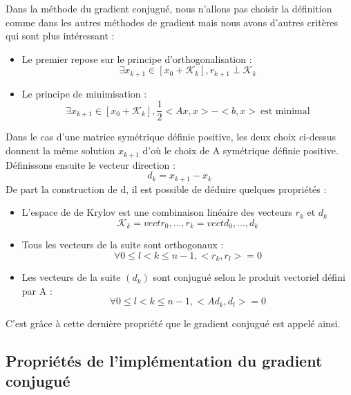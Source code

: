 Dans la méthode du gradient conjugué, nous n'allons pas choisir la définition comme dans les autres méthodes de gradient mais nous avons d'autres critères qui sont plus intéressant : 
\begin{itemize}
	\item Le premier repose sur le principe d'orthogonalisation : 
	\begin{equation}
		\exists x_{k+1} \in [x_0 + \mathcal{K}_k], r_{k+1} \perp \mathcal{K}_k
	\end{equation}
	\item Le principe de minimisation : 
	\begin{equation}
		\exists x_{k+1} \in [x_0 + \mathcal{K}_k], \frac{1}{2}<Ax, x> - <b, x> \ \text{est minimal}
	\end{equation}
\end{itemize}
Dans le cas d'une matrice symétrique définie positive, les deux choix ci-dessus donnent la même solution $x_{k+1}$ d'où le choix de A symétrique définie positive. \\
Définissons ensuite le vecteur direction : 
\begin{equation}
d_k = x_{k+1} - x_k
\end{equation}
De part la construction de d, il  est possible de déduire quelques propriétés : 
\begin{itemize}
	\item L'espace de de Krylov est une combinaison linéaire des vecteurs $r_k$ et $d_k$
	\begin{equation}
	\mathcal{K}_k = vect{r_0, ..., r_k} = vect{d_0, ..., d_k}
	\end{equation}
	\item Tous les vecteurs de la suite sont orthogonaux : 
	\begin{equation}
		\forall 0 \leq l < k \leq n - 1, <r_k, r_l> = 0
	\end{equation}
	\item Les vecteurs de la suite $(d_k)$ sont conjugué selon le produit vectoriel défini par A : 
	\begin{equation}
		\forall 0 \leq l < k \leq n - 1, <Ad_k, d_l> = 0
	\end{equation}
\end{itemize}
C'est grâce à cette dernière propriété que le gradient conjugué est appelé ainsi.
\subsection{Propriétés de l'implémentation du gradient conjugué}

